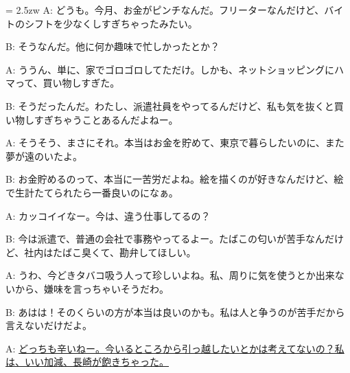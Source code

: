 \documentclass[11pt]{amsart}
\title{}
\author{}
\newenvironment{hangall}[1]{\hangindent = 2.5zw\everypar{\hangindent = 2.5zw}}{}
\begin{document}
\maketitle
\begin{hangall}{}%
A: どうも。今月、お金がピンチなんだ。フリーターなんだけど、バイトのシフトを少なくしすぎちゃったみたい。

B: そうなんだ。他に何か趣味で忙しかったとか？

A: ううん、単に、家でゴロゴロしてただけ。しかも、ネットショッピングにハマって、買い物しすぎた。

B: そうだったんだ。わたし、派遣社員をやってるんだけど、私も気を抜くと買い物しすぎちゃうことあるんだよねー。

A: そうそう、まさにそれ。本当はお金を貯めて、東京で暮らしたいのに、また夢が遠のいたよ。

B: お金貯めるのって、本当に一苦労だよね。絵を描くのが好きなんだけど、絵で生計たてられたら一番良いのになぁ。

A: カッコイイなー。今は、違う仕事してるの？

B: 今は派遣で、普通の会社で事務やってるよー。たばこの匂いが苦手なんだけど、社内はたばこ臭くて、勘弁してほしい。

A: うわ、今どきタバコ吸う人って珍しいよね。私、周りに気を使うとか出来ないから、嫌味を言っちゃいそうだわ。

B: あはは！そのくらいの方が本当は良いのかも。私は人と争うのが苦手だから言えないだけだよ。

A: \ul{どっちも辛いねー。今いるところから引っ越したいとかは考えてないの？私は、いい加減、長崎が飽きちゃった。}\end{hangall}
\end{document}
